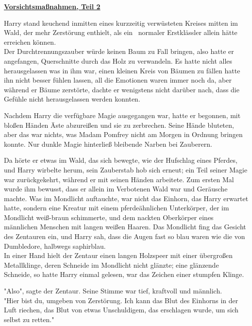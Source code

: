 

\hypertarget{vorsichtsmauxdfnahmen-teil-2}{%

\textbf{\uline{Vorsichtsmaßnahmen, Teil 2}}

Harry stand keuchend inmitten eines kurzzeitig verwüsteten Kreises mitten im Wald, der mehr Zerstörung enthielt, als ein ~normaler Erstklässler allein hätte erreichen können.\\ Der Durchtrennungszauber würde keinen Baum zu Fall bringen, also hatte er angefangen, Querschnitte durch das Holz zu verwandeln. Es hatte nicht alles herausgelassen was in ihm war, einen kleinen Kreis von Bäumen zu fällen hatte ihn nicht besser fühlen lassen, all die Emotionen waren immer noch da, aber während er Bäume zerstörte, dachte er wenigstens nicht darüber nach, dass die Gefühle nicht herausgelassen werden konnten.

Nachdem Harry die verfügbare Magie ausgegangen war, hatte er begonnen, mit bloßen Händen Äste abzureißen und sie zu zerbrechen. Seine Hände bluteten, aber das war nichts, was Madam Pomfrey nicht am Morgen in Ordnung bringen konnte. Nur dunkle Magie hinterließ bleibende Narben bei Zauberern.

Da hörte er etwas im Wald, das sich bewegte, wie der Hufschlag eines Pferdes, und Harry wirbelte herum, sein Zauberstab hob sich erneut; ein Teil seiner Magie war zurückgekehrt, während er mit seinen Händen arbeitete. Zum ersten Mal wurde ihm bewusst, dass er allein im Verbotenen Wald war und Geräusche machte. Was im Mondlicht auftauchte, war nicht das Einhorn, das Harry erwartet hatte, sondern eine Kreatur mit einem pferdeähnlichen Unterkörper, der im Mondlicht weiß-braun schimmerte, und dem nackten Oberkörper eines männlichen Menschen mit langen weißen Haaren. Das Mondlicht fing das Gesicht des Zentauren ein, und Harry sah, dass die Augen fast so blau waren wie die von Dumbledore, halbwegs saphirblau.\\ In einer Hand hielt der Zentaur einen langen Holzspeer mit einer übergroßen Metallklinge, deren Schneide im Mondlicht nicht glänzte; eine glänzende Schneide, so hatte Harry einmal gelesen, war das Zeichen einer stumpfen Klinge.

"Also", sagte der Zentaur. Seine Stimme war tief, kraftvoll und männlich.\\ "Hier bist du, umgeben von Zerstörung. Ich kann das Blut des Einhorns in der Luft riechen, das Blut von etwas Unschuldigem, das erschlagen wurde, um sich selbst zu retten."

}
